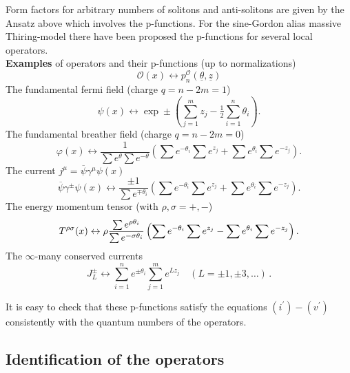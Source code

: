 \documentclass[a4paper,12pt]{article}
\begin{document}
Form factors for arbitrary numbers of solitons and anti-solitons are given
by the Ansatz above which involves the p-functions. For the sine-Gordon
alias massive Thiring-model there have been proposed the p-functions for
several local operators. \\[3pt]
\textbf{Examples} of operators and their p-functions (up to normalizations)
\cite{BK} 
\[
\mathcal{O}(x)\leftrightarrow p_{n}^{\mathcal{O}}(\underline{\theta },%
\underline{z}) 
\]
{The fundamental fermi field} (charge $q=n-2m=1$) \cite{BFKZ} 
\[
\psi (x)\leftrightarrow \exp \pm \left( \sum_{j=1}^{m}z_{j}-\tfrac{1}{2}%
\sum_{i=1}^{n}\theta _{i}\right) . 
\]
{The fundamental breather field} (charge $q=n-2m=0$) \cite{BK} 
\[
\varphi (x)\leftrightarrow \frac{1}{\sum e^{\theta }\sum e^{-\theta }}\left(
\sum e^{-\theta _{i}}\sum e^{z_{j}}+\sum e^{\theta _{i}}\sum
e^{-z_{j}}\right) . 
\]
{The current} $j^{\mu }=\overline{\psi }\gamma ^{\mu }\psi (x)$ \cite{BK} 
\[
\overline{\psi }\gamma ^{\pm }\psi (x)\leftrightarrow \frac{\pm 1}{\sum
e^{\mp \theta _{i}}}\left( \sum e^{-\theta _{i}}\sum e^{z_{j}}+\sum
e^{\theta _{i}}\sum e^{-z_{j}}\right) . 
\]
{The energy momentum tensor} (with $\rho ,\sigma =+,-$) \cite{BK} 
\[
T{^{\rho \sigma }(x)}\leftrightarrow \rho \frac{\sum e^{\rho \theta _{i}}}{%
\sum e^{-\sigma \theta _{i}}}\left( \sum e^{-\theta _{i}}\sum e^{z_{j}}-\sum
e^{\theta _{i}}\sum e^{-z_{j}}\right) . 
\]
The $\infty $-many conserved currents \cite{BK} 
\[
J_{L}^{\pm }\leftrightarrow \sum_{i=1}^{n}e^{\pm \theta
_{i}}\sum_{j=1}^{m}e^{Lz_{j}}\quad (L=\pm 1,\pm 3,\dots )\,. 
\]

It is easy to check that these p-functions satisfy the equations $(i^{\prime
})-(v^{\prime })$ consistently with the quantum numbers of the operators.

\subsection*{Identification of the operators}
\end{document}
